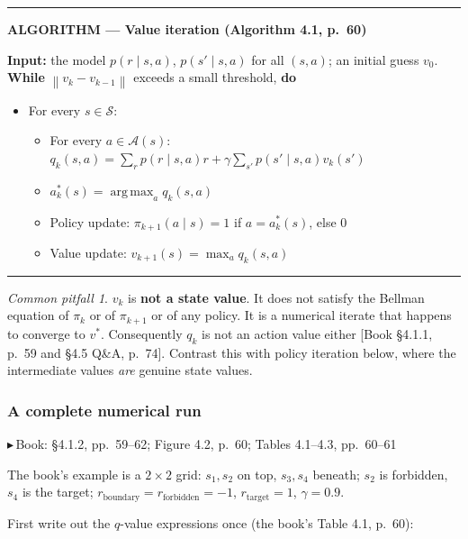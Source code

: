 \documentclass[11pt, letterpaper]{article}
\theoremstyle{runin}
\theoremstyle{runinplain}
\theoremstyle{remark}
\newtheorem*{warning}{Common pitfall}
\newcommand{\norm}[1]{\left\lVert #1 \right\rVert}
\newcommand{\Sspace}{\mathcal{S}}
\newcommand{\Aspace}{\mathcal{A}}
\newcommand{\argmax}{\operatorname*{arg\,max}}
\newcommand{\bk}[1]{{\color{bookblue}\small$\blacktriangleright$\,\textsf{Book: #1}}}
\newcommand{\bkin}[1]{{\color{bookblue}\small[\textsf{Book #1}]}}
\newenvironment{algobox}[1]
  {\par\medskip\noindent\rule{\textwidth}{0.9pt}\par\nobreak\vspace{0.25em}
   \noindent\textbf{\small ALGORITHM --- #1}\par\nobreak\vspace{0.15em}
   \small}
  {\par\nobreak\vspace{0.25em}\noindent\rule{\textwidth}{0.9pt}\par\medskip}
\begin{document}
\begin{algobox}{Value iteration (Algorithm 4.1, p.~60)}
\textbf{Input:} the model $p(r\mid s,a)$, $p(s'\mid s,a)$ for all $(s,a)$; an initial
guess $v_0$.\\
\textbf{While} $\norm{v_k-v_{k-1}}$ exceeds a small threshold, \textbf{do}
\begin{itemize}\itemsep0pt
  \item For every $s\in\Sspace$:
  \begin{itemize}\itemsep0pt
    \item For every $a\in\Aspace(s)$:\quad
          $q_k(s,a)=\sum_r p(r\mid s,a)r+\gamma\sum_{s'}p(s'\mid s,a)v_k(s')$
    \item $a_k^*(s)=\argmax_a q_k(s,a)$
    \item Policy update: $\pi_{k+1}(a\mid s)=1$ if $a=a_k^*(s)$, else $0$
    \item Value update: $v_{k+1}(s)=\max_a q_k(s,a)$
  \end{itemize}
\end{itemize}
\end{algobox}

\begin{warning}
$v_k$ is \textbf{not a state value}. It does not satisfy the Bellman equation of
$\pi_k$ or of $\pi_{k+1}$ or of any policy. It is a numerical iterate that happens
to converge to $v^*$. Consequently $q_k$ is not an action value either
\bkin{\S4.1.1, p.~59 and \S4.5 Q\&A, p.~74}. Contrast this with policy iteration
below, where the intermediate values \emph{are} genuine state values.
\end{warning}

\subsubsection{A complete numerical run}

\bk{\S4.1.2, pp.~59--62; Figure 4.2, p.~60; Tables 4.1--4.3, pp.~60--61}

The book's example is a $2\times2$ grid: $s_1,s_2$ on top, $s_3,s_4$ beneath;
$s_2$ is forbidden, $s_4$ is the target;
$r_{\text{boundary}}=r_{\text{forbidden}}=-1$, $r_{\text{target}}=1$, $\gamma=0.9$.

First write out the $q$-value expressions once (the book's Table 4.1, p.~60):
\end{document}
